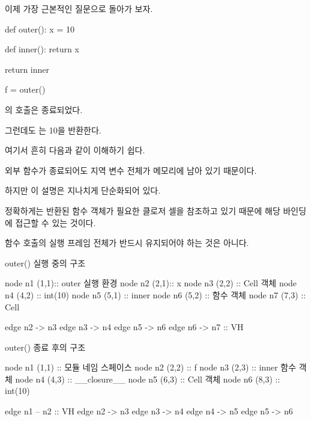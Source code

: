 이제 가장 근본적인 질문으로 돌아가 보자.

\begin{dhkcode}
def outer():
    x = 10

    def inner():
        return x

    return inner


f = outer()
\end{dhkcode}

의 호출은 종료되었다.

그런데도 는 10을 반환한다.

여기서 흔히 다음과 같이 이해하기 쉽다.

\begin{dhksmry}[centered]
외부 함수가 종료되어도 지역 변수 전체가 메모리에 남아 있기 때문이다.
\end{dhksmry}

하지만 이 설명은 지나치게 단순화되어 있다.

정확하게는 반환된 함수 객체가 필요한 클로저 셀을 참조하고 있기 때문에 해당 바인딩에 접근할 수 있는 것이다.

함수 호출의 실행 프레임 전체가 반드시 유지되어야 하는 것은 아니다.

\begin{dhknote}
\begin{dhksmry}[centered]
outer() 실행 중의 구조
\end{dhksmry}
\end{dhknote}

\begin{dhkdiagram}[in=6]
node n1 (1,1):: outer 실행 환경
node n2 (2,1):: x
node n3 (2,2) :: Cell 객체
node n4 (4,2) :: int(10)
node n5 (5,1) :: inner
node n6 (5,2) :: 함수 객체
node n7 (7,3) :: Cell

edge n2 -> n3
edge n3 -> n4
edge n5 -> n6
edge n6 -> n7 :: VH
\end{dhkdiagram}

\begin{dhknote}
\begin{dhksmry}[centered]
outer() 종료 후의 구조
\end{dhksmry}
\end{dhknote}

\begin{dhkdiagram}[in=6]
node n1 (1,1) :: 모듈 네임 스페이스
node n2 (2,2) :: f
node n3 (2,3) :: inner 함수 객체
node n4 (4,3) :: __closure__
node n5 (6,3) :: Cell 객체
node n6 (8,3) :: int(10)

edge n1 -- n2 :: VH
edge n2 -> n3
edge n3 -> n4
edge n4 -> n5
edge n5 -> n6
\end{dhkdiagram}

